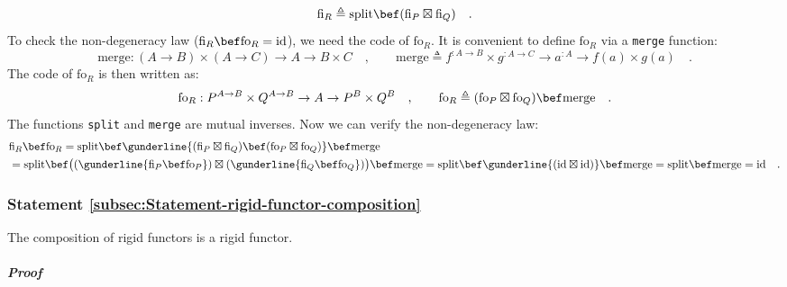 \[
\text{fi}_{R}\triangleq\text{split}\bef(\text{fi}_{P}\boxtimes\text{fi}_{Q})\quad.
\]
To check the non-degeneracy law ($\text{fi}_{R}\bef\text{fo}_{R}=\text{id}$),
we need the code of $\text{fo}_{R}$. It is convenient to define $\text{fo}_{R}$
via a \lstinline!merge! function:
\[
\text{merge}:\left(A\rightarrow B\right)\times\left(A\rightarrow C\right)\rightarrow A\rightarrow B\times C\quad,\quad\quad\text{merge}\triangleq f^{:A\rightarrow B}\times g^{:A\rightarrow C}\rightarrow a^{:A}\rightarrow f(a)\times g(a)\quad.
\]
The code of $\text{fo}_{R}$ is then written as:
\[
\text{fo}_{R}:P^{A\rightarrow B}\times Q^{A\rightarrow B}\rightarrow A\rightarrow P^{B}\times Q^{B}\quad,\quad\quad\text{fo}_{R}\triangleq(\text{fo}_{P}\boxtimes\text{fo}_{Q})\bef\text{merge}\quad.
\]
The functions \lstinline!split! and \lstinline!merge! are mutual
inverses. Now we can verify the non-degeneracy law:
\begin{align*}
 & \text{fi}_{R}\bef\text{fo}_{R}=\text{split}\bef\gunderline{(\text{fi}_{P}\boxtimes\text{fi}_{Q})\bef(\text{fo}_{P}\boxtimes\text{fo}_{Q})}\bef\text{merge}\\
 & =\text{split}\bef\big((\gunderline{\text{fi}_{P}\bef\text{fo}_{P}})\boxtimes(\gunderline{\text{fi}_{Q}\bef\text{fo}_{Q}})\big)\bef\text{merge}=\text{split}\bef\gunderline{(\text{id}\boxtimes\text{id})}\bef\text{merge}=\text{split}\bef\text{merge}=\text{id}\quad.
\end{align*}


\subsubsection{Statement \label{subsec:Statement-rigid-functor-composition}\ref{subsec:Statement-rigid-functor-composition}}

The composition of rigid functors is a rigid functor.

\subparagraph{Proof}

